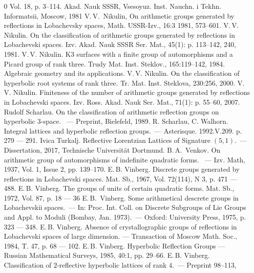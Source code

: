 \documentclass[reqno,12pt]{amsart}
\newcounter{z}
\begin{document}
\begin{thebibliography}{0}
Vol. 18, p. 3--114. Akad. Nauk SSSR, Vsesoyuz. Inst. Nauchn. i Tekhn. Informatsii, Moscow, 1981
V.\,V.~Nikulin, 
On arithmetic groups generated by reflections in Lobachevsky spaces, Math. USSR-Izv., 16:3 
1981, 573--601.
V.\,V. Nikulin. On the classification of arithmetic groups generated by reflections in Lobachevski
spaces. Izv. Akad. Nauk SSSR Ser. Mat., 45(1): p. 113--142, 240, 1981.
V.\,V. Nikulin. K3 surfaces with a finite group of automorphisms and a Picard group of rank three. Trudy Mat. Inst. Steklov., 165:119--142, 1984. Algebraic geometry and its applications.
V.\,V. Nikulin. On the classification of hyperbolic root systems of rank three. Tr. Mat. Inst. Steklova, 230:256, 2000.
V.\,V. Nikulin. Finiteness of the number of arithmetic groups generated by reflections in Lobachevski spaces. Izv. Ross. Akad. Nauk Ser. Mat., 71(1): p. 55--60, 2007.
Rudolf Scharlau. On the classification of arithmetic reflection groups on hyperbolic $3$-space.
~--- Preprint, Bielefeld, 1989.
R. Scharlau, C. Walhorn. Integral lattices and hyperbolic 
reflection groups.~--- Asterisque. 1992.V.209. p. 279 --- 291.
Ivica Turkalj. Reflective Lorentzian Lattices of Signature $(5,1)$.~--- Dissertation, 2017,
Technische Universität Dortmund.
 B.\,A.~Venkov.
On arithmetic group of automorphisms of indefinite quadratic forms.
~--- Izv. Math, 1937, Vol. 1, Issue 2, pp. 139--170.
E.\,B. Vinberg. Discrete groups generated by reflections in Lobachevski spaces. Mat. Sb., 1967, Vol. 72(114), N 3, p. 471 --- 488.
E.\,B. Vinberg. The groups of units of certain quadratic forms. Mat. Sb., 1972, Vol. 87, p. 18 --- 36
E.\,B.~Vinberg. Some arithmetical descrete groups in Lobachevskii spaces.~--- In: Proc.
Int. Coll. on Discrete Subgroups of Lie Groups and Appl. to Moduli (Bombay,
Jan. 1973).~--- Oxford: University Press, 1975, p. 323 --- 348.
E.\,B. Vinberg. Absence of crystallographic groups of reflections in Lobachevski spaces of large
dimension. --- Transaction of Moscow Math. Soc., 1984, T. 47, p. 68 --- 102.
E.\,B. Vinberg. Hyperbolic Reflection Groups --- Russian Mathematical Surveys, 1985, 40:1, 
pp. 29--66.
E.\,B. Vinberg. Classification of $2$-reflective hyperbolic lattices of rank $4$.~--- Preprint 98–113,

\end{thebibliography}
\end{document}
